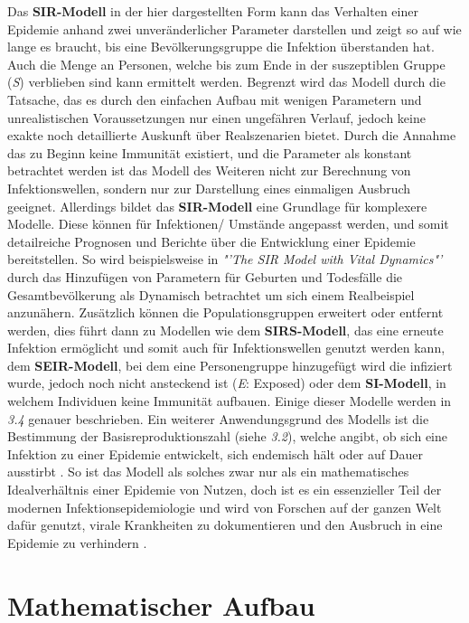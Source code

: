 \documentclass[12pt]{scrartcl} %
\begin{document}
Das \textbf{SIR-Modell} in der hier dargestellten Form kann das Verhalten einer Epidemie anhand zwei unveränderlicher Parameter darstellen und zeigt so auf wie lange es braucht, bis eine Bevölkerungsgruppe die Infektion überstanden hat. Auch die Menge an Personen, welche bis zum Ende in der suszeptiblen Gruppe (\textit{S}) verblieben sind kann ermittelt werden. 
Begrenzt wird das Modell durch die Tatsache, das es durch den einfachen Aufbau mit wenigen Parametern und unrealistischen Voraussetzungen nur einen ungefähren Verlauf, jedoch keine exakte noch detaillierte Auskunft über Realszenarien bietet.
Durch die Annahme das zu Beginn keine Immunität existiert, und die Parameter als konstant betrachtet werden ist das Modell des Weiteren nicht zur Berechnung von Infektionswellen, sondern nur zur Darstellung eines einmaligen Ausbruch geeignet.
Allerdings bildet das \textbf{SIR-Modell} eine Grundlage für komplexere Modelle. Diese können für Infektionen/ Umstände angepasst werden, und somit detailreiche Prognosen und Berichte über die Entwicklung einer Epidemie bereitstellen.
So wird beispielsweise in \textsl{"'The SIR Model with Vital Dynamics"'} \cite{5} durch das Hinzufügen von Parametern für Geburten und Todesfälle die Gesamtbevölkerung als Dynamisch betrachtet um sich einem Realbeispiel anzunähern.
Zusätzlich können die Populationsgruppen erweitert oder entfernt werden, dies führt dann zu Modellen wie dem 
\textbf{SIRS-Modell}, das eine erneute Infektion ermöglicht und somit auch für Infektionswellen genutzt werden kann, dem \textbf{SEIR-Modell}, bei dem eine Personengruppe hinzugefügt wird die infiziert wurde, jedoch noch nicht ansteckend ist (\textit{E}: Exposed) oder dem \textbf{SI-Modell}, in welchem Individuen keine Immunität aufbauen.
Einige dieser Modelle werden in \textsl{3.4} genauer beschrieben.
Ein weiterer Anwendungsgrund des Modells ist die Bestimmung der Basisreproduktionszahl (siehe \textsl{3.2}), welche angibt, ob sich eine Infektion zu einer Epidemie entwickelt, sich endemisch hält oder auf Dauer ausstirbt \cite{2}.
So ist das Modell als solches zwar nur als ein mathematisches Idealverhältnis einer Epidemie von Nutzen, doch ist es ein essenzieller Teil der modernen Infektionsepidemiologie und wird von Forschen auf der ganzen Welt dafür genutzt, virale Krankheiten zu dokumentieren und den Ausbruch in eine Epidemie zu verhindern \cite{3}.

\section{Mathematischer Aufbau}
\end{document}
